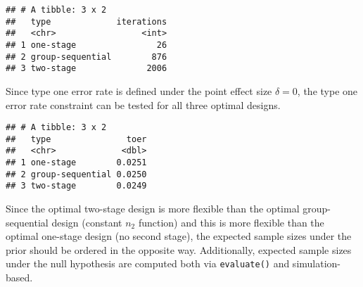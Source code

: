 \documentclass[
]{book}
\newenvironment{Shaded}{\begin{snugshade}}{\end{snugshade}}
\newcommand{\DataTypeTok}[1]{\textcolor[rgb]{0.13,0.29,0.53}{#1}}
\newcommand{\DecValTok}[1]{\textcolor[rgb]{0.00,0.00,0.81}{#1}}
\newcommand{\FloatTok}[1]{\textcolor[rgb]{0.00,0.00,0.81}{#1}}
\newcommand{\KeywordTok}[1]{\textcolor[rgb]{0.13,0.29,0.53}{\textbf{#1}}}
\newcommand{\NormalTok}[1]{#1}
\newcommand{\OperatorTok}[1]{\textcolor[rgb]{0.81,0.36,0.00}{\textbf{#1}}}
\newcommand{\StringTok}[1]{\textcolor[rgb]{0.31,0.60,0.02}{#1}}
\begin{document}
\begin{verbatim}
## # A tibble: 3 x 2
##   type             iterations
##   <chr>                 <int>
## 1 one-stage                26
## 2 group-sequential        876
## 3 two-stage              2006
\end{verbatim}

Since type one error rate is defined under the point effect size \(\delta=0\),
the type one error rate constraint can be tested for all three optimal designs.

\begin{Shaded}
\end{Shaded}

\begin{verbatim}
## # A tibble: 3 x 2
##   type               toer
##   <chr>             <dbl>
## 1 one-stage        0.0251
## 2 group-sequential 0.0250
## 3 two-stage        0.0249
\end{verbatim}

Since the optimal two-stage design is more flexible than the optimal
group-sequential design (constant \(n_2\) function) and this is
more flexible than the optimal one-stage design (no second stage),
the expected sample sizes under the prior should be ordered in the opposite way.
Additionally, expected sample sizes under the null hypothesis
are computed both via \texttt{evaluate()} and simulation-based.
\end{document}
